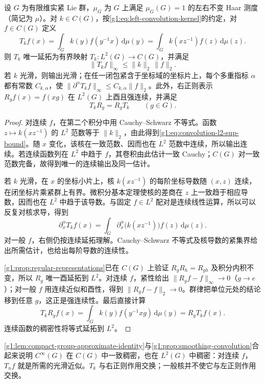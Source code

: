 \begin{proposition}\label{g1:prop:smoothing-convolution}
	设 \(G\) 为有限维实紧 Lie 群，\(\mu_G\) 为 \(G\) 上满足 \(\mu_G(G)=1\) 的左右不变 Haar 测度（简记为 \(\mu\)）。对 \(k\in C(G)\)，按\eqref{g1:eq:left-convolution-kernel}的约定，对 \(f\in C(G)\) 定义
	\[
		T_kf(x)=\int_G k(y)f(y^{-1}x)\,\mathrm{d}\mu(y)
		=\int_G k(xz^{-1})f(z)\,\mathrm{d}\mu(z).
	\]
	则 \(T_k\) 唯一延拓为有界映射 \(T_k:L^2(G)\to C(G)\)，并满足
	\begin{equation}\label{g1:eq:convolution-l2-sup-bound}
		\|T_kf\|_\infty\le\|k\|_2\,\|f\|_2.
	\end{equation}
	若 \(k\) 光滑，则输出光滑；在任一闭包紧含于坐标域的坐标片上，每个多重指标 \(\alpha\) 都有常数 \(C_{k,\alpha}\)，使 \(\|\partial^\alpha T_kf\|_\infty\le C_{k,\alpha}\|f\|_2\)。此外，右正则表示 \(R_gf(x)=f(xg)\) 在 \(L^2(G)\) 上酉且强连续，并满足
	\[
		T_kR_g=R_gT_k\qquad(g\in G).
	\]
\end{proposition}
\begin{proof}
	对连续 \(f\)，在第二个积分中用 Cauchy--Schwarz 不等式。函数 \(z\mapsto k(xz^{-1})\) 的 \(L^2\) 范数等于 \(\|k\|_2\)，由此得到\eqref{g1:eq:convolution-l2-sup-bound}。随 \(x\) 变化，该核在一致范数、因而也在 \(L^2\) 范数中连续，所以输出连续。若连续函数列在 \(L^2\) 中趋于 \(f\)，其卷积由此估计一致 Cauchy；\(C(G)\) 对一致范数完备，故得到唯一的连续输出及同一估计。

	若 \(k\) 光滑，在 \(x\) 的坐标小片上，核 \(k(xz^{-1})\) 的每阶坐标导数随 \((x,z)\) 连续，在闭坐标片乘紧群上有界。微积分基本定理使核的差商在 \(z\) 上一致趋于相应导数，因而也在 \(L^2\) 中趋于该导数。与固定 \(f\in L^2\) 配对是连续线性运算，所以可以反复对核求导，得到
	\[
		\partial_x^\alpha T_kf(x)
		=\int_G\partial_x^\alpha\bigl(k(xz^{-1})\bigr)f(z)\,\mathrm{d}\mu(z).
	\]
	对一般 \(f\)，右侧仍按连续延拓理解。Cauchy--Schwarz 不等式及核导数的紧集界给出所需估计，也给出每阶导数的连续性。

	\cref{g1:prop:regular-representations}已在 \(C(G)\) 上验证 \(R_gR_h=R_{gh}\) 及积分内积不变，所以 \(R_g\) 唯一酉延拓到 \(L^2\)。对连续 \(f\)，紧性给出 \(\|R_gf-f\|_\infty\to0\)（\(g\to e\)）；对一般 \(f\) 用连续近似和酉性，得到 \(\|R_gf-f\|_2\to0\)。群律把单位元处的结论移到任意 \(g\)，这正是强连续性。最后直接计算
	\[
		T_kR_gf(x)=\int_Gk(y)f(y^{-1}xg)\,\mathrm{d}\mu(y)
		=R_gT_kf(x).
	\]
	连续函数的稠密性将等式延拓到 \(L^2\)。
\end{proof}

\cref{g1:lem:compact-group-approximate-identity}与\cref{g1:prop:smoothing-convolution}合起来说明 \(C^\infty(G)\) 在 \(C(G)\) 中一致稠密，也在 \(L^2(G)\) 中稠密：对连续 \(f\)，\(T_nf\) 就是所需的光滑近似。\(T_k\) 与右正则作用交换；一般核并不使它与左正则作用交换。

